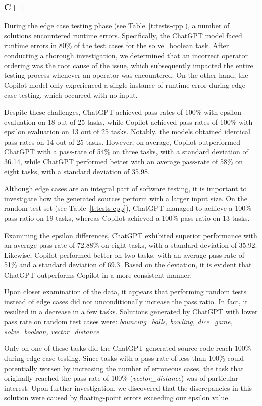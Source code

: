 \subsubsection{C++}

During the edge case testing phase (see Table~\ref{t:tests-cpp}), a number of solutions encountered runtime errors.
Specifically, the ChatGPT model faced runtime errors in 80\% of the test cases for the solve\_boolean task.
After conducting a thorough investigation, we determined that an incorrect operator ordering was the root cause of the issue, which subsequently impacted the entire testing process whenever an operator was encountered.
On the other hand, the Copilot model only experienced a single instance of runtime error during edge case testing, which occurred with no input.

Despite these challenges, ChatGPT achieved pass rates of 100\% with epsilon evaluation on 18 out of 25 tasks, while Copilot achieved pass rates of 100\% with epsilon evaluation on 13 out of 25 tasks.
Notably, the models obtained identical pass-rates on 14 out of 25 tasks.
However, on average, Copilot outperformed ChatGPT with a pass-rate of 54\% on three tasks, with a standard deviation of 36.14, while ChatGPT performed better with an average pass-rate of 58\% on eight tasks, with a standard deviation of 35.98.

Although edge cases are an integral part of software testing, it is important to investigate how the generated sources perform with a larger input size.
On the random test set (see Table~\ref{t:tests-cpp}), ChatGPT managed to achieve a 100\% pass ratio on 19 tasks, whereas Copilot achieved a 100\% pass ratio on 13 tasks.

Examining the epsilon differences, ChatGPT exhibited superior performance with an average pass-rate of 72.88\% on eight tasks, with a standard deviation of 35.92.
Likewise, Copilot performed better on two tasks, with an average pass-rate of 51\% and a standard deviation of 69.3.
Based on the deviation, it is evident that ChatGPT outperforms Copilot in a more consistent manner.

Upon closer examination of the data, it appears that performing random tests instead of edge cases did not unconditionally increase the pass ratio.
In fact, it resulted in a decrease in a few tasks.
Solutions generated by ChatGPT with lower pass rate on random test cases were:
\textit{bouncing\_balls,
	bowling,
	dice\_game,
	solve\_boolean,
	vector\_distance}.

Only on one of these tasks did the ChatGPT-generated source code reach 100\% during edge case testing.
Since tasks with a pass-rate of less than 100\% could potentially worsen by increasing the number of erroneous cases, the task that originally reached the pass rate of 100\% (\textit{vector\_distance}) was of particular interest.
Upon further investigation, we discovered that the discrepancies in this solution were caused by floating-point errors exceeding our epsilon value.

